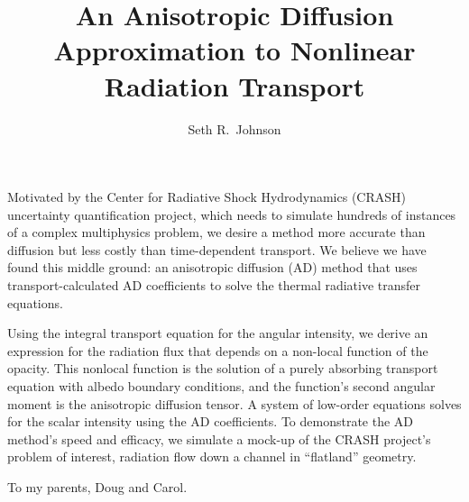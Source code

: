 \documentclass[12pt, letterpaper, draft]{umthesis}
\author{Seth R.~Johnson}
\title{An Anisotropic Diffusion Approximation to Nonlinear Radiation
Transport}
\begin{document}
\frontmatter

\maketitle

\begin{finalabstract}
Motivated by the Center for Radiative Shock Hydrodynamics (CRASH) uncertainty
quantification project, which needs to simulate hundreds of instances of a
complex multiphysics problem, we desire a method more accurate than diffusion
but less costly than time-dependent transport. We believe we have found this
middle ground: an anisotropic diffusion (AD) method that uses
transport-calculated AD coefficients to solve the thermal radiative transfer
equations.

Using the integral transport equation for the angular intensity, we derive an
expression for the radiation flux that depends on a non-local function of the
opacity. This nonlocal function is the solution of a purely absorbing transport
equation with albedo boundary conditions, and the function's second angular
moment is the anisotropic diffusion tensor. A system of low-order equations
solves for the scalar intensity using the AD coefficients. To demonstrate the
AD method's speed and efficacy, we simulate a mock-up of the CRASH project's
problem of interest, radiation flow down a channel in ``flatland'' geometry.

\end{finalabstract}
\makecopyright


\begin{dedication}
  To my parents, Doug and Carol.
\end{dedication}
\end{document}
